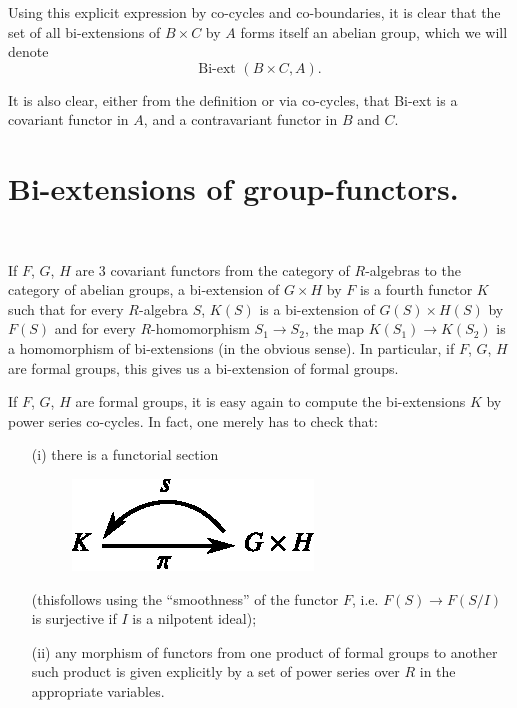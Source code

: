Using this explicit expression by co-cycles and co-boundaries, it is clear that the set of all bi-extensions of $B\times C$ by $A$ forms itself an abelian group, which we will denote
$$
\text{Bi-ext~}(B\times C,A).
$$

It is also clear, either from the definition or via co-cycles, that Bi-ext is a covariant functor in $A$, and a contravariant functor in $B$ and $C$.

\section{Bi-extensions of group-functors.}\label{art15-sec3}

~

\begin{defi*}
If $F$, $G$, $H$ are $3$ covariant functors from the category of $R$-algebras to the category of abelian groups, a bi-extension of $G\times H$ by $F$ is a fourth functor $K$ such that for every $R$-algebra $S$, $K(S)$ is a bi-extension of $G(S)\times H(S)$ by $F(S)$ and for every $R$-homomorphism $S_{1}\to S_{2}$, the map $K(S_{1})\to K(S_{2})$ is a homomorphism of bi-extensions (in the obvious sense). In particular, if $F$, $G$, $H$ are formal groups, this gives us a bi-extension of formal groups.
\end{defi*}

If $F$, $G$, $H$ are formal groups, it is easy again to compute the bi-extensions $K$ by power series co-cycles. In fact, one merely has to check that:
\begin{itemize}
\item[(i)] there is a functorial section
\begin{figure}[H]
\centering
\includegraphics{src/chap15/fig2.eps}
\end{figure}
(this\pageoriginale follows using the ``smoothness'' of the functor $F$, i.e. $F(S)\to F(S/I)$ is surjective if $I$ is a nilpotent ideal);

\item[(ii)] any morphism of functors from one product of formal groups to another such product is given explicitly by a set of power series over $R$ in the appropriate variables.
\end{itemize}

